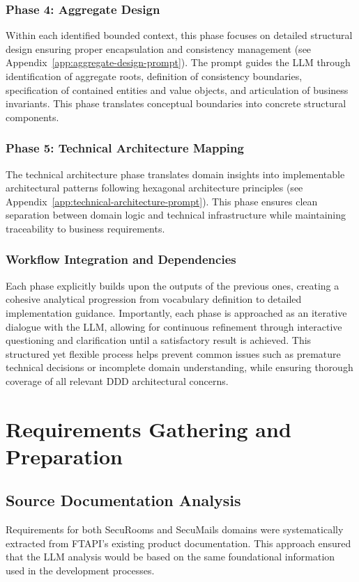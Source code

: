 \subsubsection{Phase 4: Aggregate Design}
Within each identified bounded context, this phase focuses on detailed structural design ensuring proper encapsulation and consistency management (see Appendix~\ref{app:aggregate-design-prompt}). The prompt guides the LLM through identification of aggregate roots, definition of consistency boundaries, specification of contained entities and value objects, and articulation of business invariants. This phase translates conceptual boundaries into concrete structural components.

\subsubsection{Phase 5: Technical Architecture Mapping}
The technical architecture phase translates domain insights into implementable architectural patterns following hexagonal architecture principles (see Appendix~\ref{app:technical-architecture-prompt}). This phase ensures clean separation between domain logic and technical infrastructure while maintaining traceability to business requirements.

\subsubsection{Workflow Integration and Dependencies}
Each phase explicitly builds upon the outputs of the previous ones, creating a cohesive analytical progression from vocabulary definition to detailed implementation guidance. Importantly, each phase is approached as an iterative dialogue with the LLM, allowing for continuous refinement through interactive questioning and clarification until a satisfactory result is achieved. This structured yet flexible process helps prevent common issues such as premature technical decisions or incomplete domain understanding, while ensuring thorough coverage of all relevant DDD architectural concerns.

\section{Requirements Gathering and Preparation}

\subsection{Source Documentation Analysis}
Requirements for both SecuRooms and SecuMails domains were systematically extracted from FTAPI's existing product documentation. This approach ensured that the LLM analysis would be based on the same foundational information used in the development processes.

